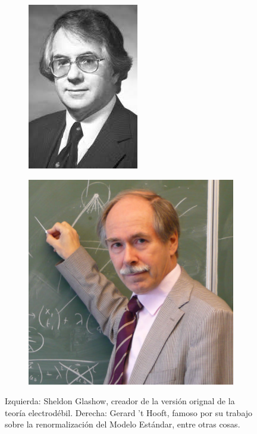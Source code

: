 \begin{figure}
\centering
\begin{subfigure}{0.5\textwidth}
\centering
\includegraphics[scale=0.45]{images/glashow.jpeg}
\end{subfigure}\begin{subfigure}{0.5\textwidth}
\centering
\includegraphics[scale=0.25]{images/thooft.jpg}
\end{subfigure}
\caption{Izquierda: Sheldon Glashow, creador de la versi\'on orignal
de la teor\'ia electrod\'ebil. Derecha: Gerard 't Hooft, famoso por
su trabajo sobre la renormalizaci\'on del Modelo Est\'andar,
entre otras cosas.}
\end{figure}

